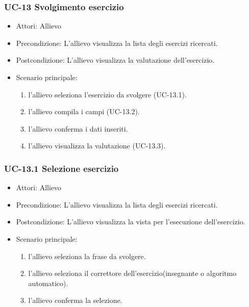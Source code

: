 	\subsubsection{UC-13 Svolgimento esercizio}
	\begin{itemize}
	\item Attori: Allievo
			\item Precondizione:  L'allievo visualizza la lista degli esercizi ricercati.
			\item Postcondizione: L'allievo visualizza la valutazione dell'esercizio.
			\item Scenario principale:
			\begin{enumerate}
				\item l'allievo seleziona l'esercizio da svolgere (UC-13.1).
				\item l'allievo compila i campi (UC-13.2).
				\item l'allievo conferma i dati inseriti.
				\item l'allievo visualizza la valutazione (UC-13.3).
			\end{enumerate}
	\end{itemize}
			
	\subsubsection{UC-13.1 Selezione esercizio}
	\begin{itemize}
			\item Attori: Allievo
			\item Precondizione: L'allievo visualizza la lista degli esercizi ricercati.
			\item Postcondizione: L'allievo visualizza la vista per l'esecuzione dell'esercizio.
			\item Scenario principale:
				\begin{enumerate}
					\item l'allievo seleziona la frase da svolgere.
					\item l'allievo seleziona il correttore dell'esercizio(insegnante o algoritmo automatico).
					\item l'allievo conferma la selezione.
				\end{enumerate}
			\end{itemize}

